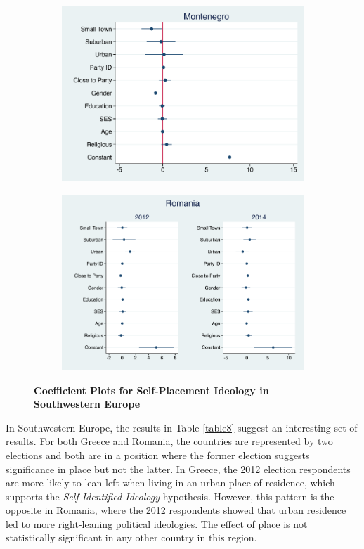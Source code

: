 \documentclass[12pt, titlepage]{article}
\newcommand\e{\emph}
\newcommand\tb{\textbf}
\begin{document}
\begin{figure}[H]
\begin{subfigure}[b]{0.475\textwidth}
		\includegraphics[width=\textwidth]{IdeologyCoef/Montenegro}
	\end{subfigure}
	\quad
	\begin{subfigure}[b]{0.475\textwidth}   
		\centering 
		\includegraphics[width=\textwidth]{IdeologyCoef/Romania}
	\end{subfigure}
	\caption[ \tb{Self-Placement Ideology - Southwestern Europe} ]
	{\tb {Coefficient Plots for Self-Placement Ideology in Southwestern Europe} }
	\label{SWEuro}
\end{figure}

In Southwestern Europe, the results in Table \ref{table8} suggest an interesting set of results. For both Greece and Romania, the countries are represented by two elections and both are in a position where the former election suggests significance in place but not the latter. In Greece, the 2012 election respondents are more likely to lean left when living in an urban place of residence, which supports the \e{Self-Identified Ideology} hypothesis. However, this pattern is the opposite in Romania, where the 2012 respondents showed that urban residence led to more right-leaning political ideologies. The effect of place is not statistically significant in any other country in this region.
\end{document}
